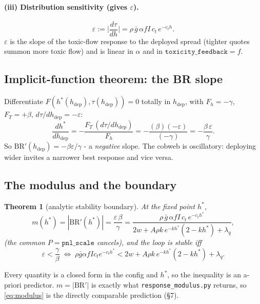 \documentclass[11pt]{article}
\newtheorem{theorem}{Theorem}
\newcommand{\eps}{\varepsilon}
\newcommand{\gbar}{\bar g}
\newcommand{\hdep}{h_{\mathrm{dep}}}
\newcommand{\code}[1]{\texttt{#1}}
\newcommand{\BR}{\mathrm{BR}}
\begin{document}
\paragraph{(iii) Distribution sensitivity (gives $\eps$).}
\begin{equation}\label{eq:eps}
  \boxed{\;
  \eps := \Big|\frac{d\tau}{dh}\Big|
  = \rho\,\gbar\,\alpha f I\,c_t\,e^{-c_t h}.
  \;}
\end{equation}
$\eps$ is the slope of the toxic-flow response to the deployed spread (tighter
quotes summon more toxic flow) and is linear in $\alpha$ and in
$\code{toxicity\_feedback}=f$.

\subsection{Implicit-function theorem: the BR slope}
Differentiate $F(h^*(\hdep),\tau(\hdep))=0$ totally in $\hdep$, with
$F_h=-\gamma$, $F_T=+\beta$, $d\tau/d\hdep=-\eps$:
%
\begin{equation*}
  \frac{dh^*}{d\hdep}
  = -\frac{F_T\,(d\tau/d\hdep)}{F_h}
  = -\frac{(\beta)(-\eps)}{(-\gamma)}
  = -\frac{\beta\,\eps}{\gamma}.
\end{equation*}
%
So $\BR'(\hdep)=-\beta\eps/\gamma$ - a \emph{negative} slope. The cobweb is
oscillatory: deploying wider invites a narrower best response and vice versa.

\subsection{The modulus and the boundary}
\begin{theorem}[analytic stability boundary]\label{thm:boundary}
At the fixed point $h^*$,
%
\begin{equation}\label{eq:modulus}
  m(h^*) = |\BR'(h^*)| = \frac{\eps\,\beta}{\gamma}
  = \frac{\rho\,\gbar\,\alpha f I\,c_t\,e^{-c_t h^*}}
         {2w + A\rho k\,e^{-k h^*}(2-k h^*) + \lambda_q},
\end{equation}
%
(the common $P=\code{pnl\_scale}$ cancels), and the loop is stable iff
%
\begin{equation*}
  \eps < \frac{\gamma}{\beta}
  \;\Longleftrightarrow\;
  \rho\gbar\alpha f I c_t e^{-c_t h^*}
  < 2w + A\rho k\,e^{-k h^*}(2-k h^*) + \lambda_q.
\end{equation*}
\end{theorem}
%
Every quantity is a closed form in the config and $h^*$, so the inequality is an
a-priori predictor. $m=|\BR'|$ is exactly what \code{response\_modulus.py} returns,
so \eqref{eq:modulus} is the directly comparable prediction (\S7).
\end{document}
